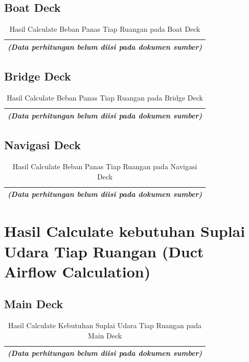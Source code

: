 \documentclass[12pt,a4paper,twoside,openright]{book}
\theoremstyle{definition}
\theoremstyle{plain}
\theoremstyle{remark}
\begin{document}
\subsection{Boat Deck}

\begin{table}[H]
\centering
\caption{Hasil Calculate Beban Panas Tiap Ruangan pada Boat Deck}
\begin{tabular}{|c|}
\hline
\textit{(Data perhitungan belum diisi pada dokumen sumber)} \\
\hline
\end{tabular}
\end{table}

\subsection{Bridge Deck}

\begin{table}[H]
\centering
\caption{Hasil Calculate Beban Panas Tiap Ruangan pada Bridge Deck}
\begin{tabular}{|c|}
\hline
\textit{(Data perhitungan belum diisi pada dokumen sumber)} \\
\hline
\end{tabular}
\end{table}

\subsection{Navigasi Deck}

\begin{table}[H]
\centering
\caption{Hasil Calculate Beban Panas Tiap Ruangan pada Navigasi Deck}
\begin{tabular}{|c|}
\hline
\textit{(Data perhitungan belum diisi pada dokumen sumber)} \\
\hline
\end{tabular}
\end{table}

\section{Hasil Calculate kebutuhan Suplai Udara Tiap Ruangan (Duct Airflow Calculation)}

\subsection{Main Deck}

\begin{table}[H]
\centering
\caption{Hasil Calculate Kebutuhan Suplai Udara Tiap Ruangan pada Main Deck}
\begin{tabular}{|c|}
\hline
\textit{(Data perhitungan belum diisi pada dokumen sumber)} \\
\hline
\end{tabular}
\end{table}
\end{document}
